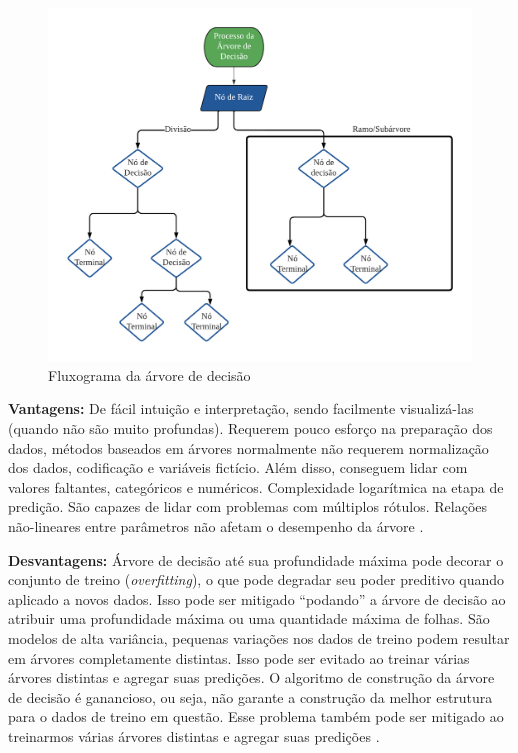 \begin{figure}[H]
	\centering
	\caption{Fluxograma da árvore de decisão}
	\label{fig:decison}
	\includegraphics[width=\linewidth]{Modelos/Figuras/decison}
	
\end{figure}



\noindent\textbf{Vantagens: }
De fácil intuição e interpretação, sendo facilmente visualizá-las (quando não são muito profundas).
Requerem pouco esforço na preparação dos dados, métodos baseados em árvores normalmente não requerem normalização dos dados, codificação e variáveis fictício. Além disso, conseguem lidar com valores faltantes, categóricos e numéricos.
Complexidade logarítmica na etapa de predição.
São capazes de lidar com problemas com múltiplos rótulos.
Relações não-lineares entre parâmetros não afetam o desempenho da árvore \cite{remigio2023arvores}.


\noindent\textbf{Desvantagens: }
Árvore de decisão até sua profundidade máxima pode decorar o conjunto de treino (\textit{overfitting}), o que pode degradar seu poder preditivo quando aplicado a novos dados. Isso pode ser mitigado ``podando'' a árvore de decisão ao atribuir uma profundidade máxima ou uma quantidade máxima de folhas.
São modelos de alta variância, pequenas variações nos dados de treino podem resultar em árvores completamente distintas. Isso pode ser evitado ao treinar várias árvores distintas e agregar suas predições.
O algoritmo de construção da árvore de decisão é ganancioso, ou seja, não garante a construção da melhor estrutura para o dados de treino em questão. Esse problema também pode ser mitigado ao treinarmos várias árvores distintas e agregar suas predições \cite{remigio2023arvores}.


